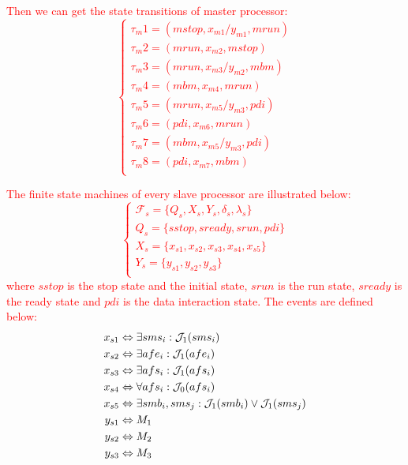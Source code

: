 \documentclass[journal,UTF8]{IEEEtran}
\begin{document}
\textcolor{red}{Then we can get the state transitions of master processor:
  \begin{equation}
 \left\{
 \begin{array}{l}
 \tau_m1 = (mstop, x_{m1}/y_{m1}, mrun)\\
 \tau_m2 = (mrun, x_{m2}, mstop)\\
 \tau_m3 = (mrun, x_{m3}/y_{m2}, mbm)\\
 \tau_m4 = (mbm, x_{m4}, mrun)\\
 \tau_m5 = (mrun, x_{m5}/y_{m3}, pdi)\\
 \tau_m6 = (pdi, x_{m6}, mrun)\\
 \tau_m7 = (mbm, x_{m5}/y_{m3}, pdi)\\
 \tau_m8 = (pdi, x_{m7}, mbm)\\
 \end{array}
 \right.
 \end{equation}}
 
 
 \textcolor{red}{The finite state machines of every slave processor are illustrated below:
 \begin{equation}
 \label{FSlave}
 \left\{
 \begin{array}{l}
 \mathcal{F}_{s} = \{Q_s, X_s, Y_s, \delta_s, \lambda_s\}\\
 Q_s = \{sstop, sready, srun, pdi\}\\
 X_s = \{x_{s1}, x_{s2}, x_{s3}, x_{s4}, x_{s5}\}\\
 Y_s = \{y_{s1}, y_{s2}, y_{s3}\}\\
 \end{array}
 \right.
 \end{equation}
 where $sstop$ is the stop state and the initial state, $srun$ is the run state, $sready$ is the ready state and $pdi$ is the data interaction state. The events are defined below:
\begin{align}
\notag x_{s1}&\Leftrightarrow \exists sms_i: \mathcal{J}_1(sms_i)\\
\notag x_{s2}&\Leftrightarrow \exists afe_i: \mathcal{J}_1(afe_i)\\
\notag x_{s3}&\Leftrightarrow \exists afs_i: \mathcal{J}_1(afs_i)\\
\notag x_{s4}&\Leftrightarrow \forall afs_i: \mathcal{J}_0(afs_i)\\
\notag x_{s5}&\Leftrightarrow \exists smb_i, sms_j: \mathcal{J}_1(smb_i) \lor \mathcal{J}_1(sms_j)\\
\notag y_{s1}&\Leftrightarrow M_1\\
\notag y_{s2}&\Leftrightarrow M_2\\
\notag y_{s3}&\Leftrightarrow M_3
\end{align}}
\end{document}
